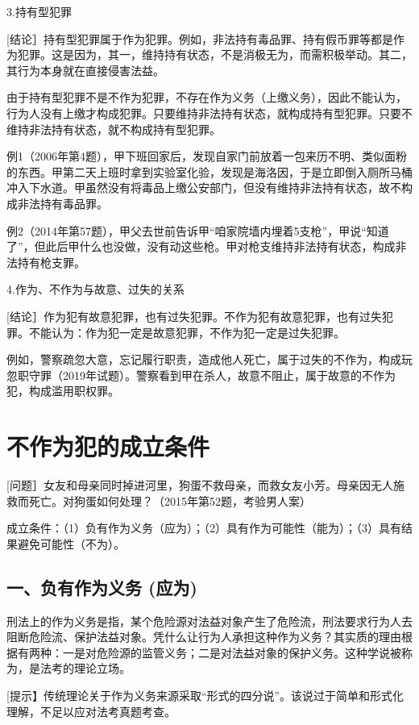 3.持有型犯罪

[结论］持有型犯罪属于作为犯罪。例如，非法持有毒品罪、持有假币罪等都是作为犯罪。这是因为，其一，维持持有状态，不是消极无为，而需积极举动。其二，其行为本身就在直接侵害法益。

由于持有型犯罪不是不作为犯罪，不存在作为义务（上缴义务），因此不能认为，行为人没有上缴才构成犯罪。只要维持非法持有状态，就构成持有型犯罪。只要不维持非法持有状态，就不构成持有型犯罪。

例1（2006年第4题），甲下班回家后，发现自家门前放着一包来历不明、类似面粉的东西。甲第二天上班时拿到实验室化验，发现是海洛因，于是立即倒入厕所马桶冲入下水道。甲虽然没有将毒品上缴公安部门，但没有维持非法持有状态，故不构成非法持有毒品罪。

例2（2014年第57题），甲父去世前告诉甲“咱家院墙内埋着5支枪”，甲说“知道了”，但此后甲什么也没做，没有动这些枪。甲对枪支维持非法持有状态，构成非法持有枪支罪。

4.作为、不作为与故意、过失的关系

[结论］作为犯有故意犯罪，也有过失犯罪。不作为犯有故意犯罪，也有过失犯罪。不能认为：作为犯一定是故意犯罪，不作为犯一定是过失犯罪。

例如，警察疏忽大意，忘记履行职责，造成他人死亡，属于过失的不作为，构成玩忽职守罪（2019年试题）。警察看到甲在杀人，故意不阻止，属于故意的不作为犯，构成滥用职权罪。

\section{不作为犯的成立条件}

[问题］女友和母亲同时掉进河里，狗蛋不救母亲，而救女友小芳。母亲因无人施救而死亡。对狗蛋如何处理？（2015年第52题，考验男人案）

成立条件：（1）负有作为义务（应为）；（2）具有作为可能性（能为）；（3）具有结果避免可能性（不为）。

\subsection*{一、负有作为义务 (应为)}

刑法上的作为义务是指，某个危险源对法益对象产生了危险流，刑法要求行为人去阻断危险流、保护法益对象。凭什么让行为人承担这种作为义务？其实质的理由根据有两种：一是对危险源的监管义务；二是对法益对象的保护义务。这种学说被称为，是法考的理论立场。

[提示】传统理论关于作为义务来源采取“形式的四分说”。该说过于简单和形式化理解，不足以应对法考真题考查。

